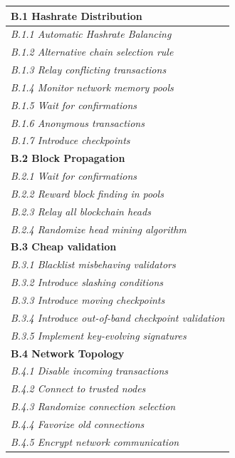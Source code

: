 \documentclass[12pt,a4paper]{article}
\begin{document}
\begin{tabular}{| l |}
  \hline

  \textbf{B.1 Hashrate Distribution}\\
  \hline
  \textit{B.1.1 Automatic Hashrate Balancing}\\
  \hline
  \textit{B.1.2 Alternative chain selection rule}\\
  \hline
  \textit{B.1.3 Relay conflicting transactions}\\
  \hline
  \textit{B.1.4 Monitor network memory pools}\\
  \hline
  \textit{B.1.5 Wait for confirmations}\\
  \hline
  \textit{B.1.6 Anonymous transactions}\\
  \hline
  \textit{B.1.7 Introduce checkpoints}\\
  \hline

  \textbf{B.2 Block Propagation}\\
  \hline
  \textit{B.2.1 Wait for confirmations}\\
  \hline
  \textit{B.2.2 Reward block finding in pools}\\
  \hline
  \textit{B.2.3 Relay all blockchain heads}\\
  \hline
  \textit{B.2.4 Randomize head mining algorithm}\\
  \hline

  \textbf{B.3 Cheap validation}\\
  \hline
  \textit{B.3.1 Blacklist misbehaving validators}\\
  \hline
  \textit{B.3.2 Introduce slashing conditions}\\
  \hline
  \textit{B.3.3 Introduce moving checkpoints}\\
  \hline
  \textit{B.3.4 Introduce out-of-band checkpoint validation}\\
  \hline
  \textit{B.3.5 Implement key-evolving signatures}\\
  \hline

  \textbf{B.4 Network Topology}\\
  \hline
  \textit{B.4.1 Disable incoming transactions}\\
  \hline
  \textit{B.4.2 Connect to trusted nodes}\\
  \hline
  \textit{B.4.3 Randomize connection selection}\\
  \hline
  \textit{B.4.4 Favorize old connections}\\
  \hline
  \textit{B.4.5 Encrypt network communication}\\
  \hline


\end{tabular}
\end{document}
